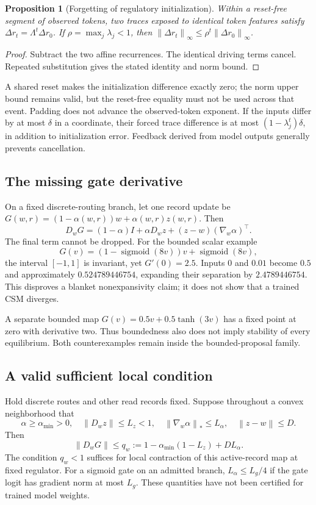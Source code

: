 \documentclass[11pt,a4paper]{article}
\newtheorem{proposition}{Proposition}
\newcommand{\norm}[1]{\left\lVert#1\right\rVert}
\newcommand{\sigmoid}{\operatorname{sigmoid}}
\begin{document}
\begin{proposition}[Forgetting of regulatory initialization]
Within a reset-free segment of observed tokens, two traces exposed to identical
token features satisfy
\(\Delta r_t=\Lambda^t\Delta r_0\). If \(\rho=\max_j\lambda_j<1\), then
\(\norm{\Delta r_t}_\infty\le\rho^t\norm{\Delta r_0}_\infty\).
\end{proposition}
\begin{proof}
Subtract the two affine recurrences. The identical driving terms cancel.
Repeated substitution gives the stated identity and norm bound.
\end{proof}
A shared reset makes the initialization difference exactly zero; the norm
upper bound remains valid, but the reset-free equality must not be used across
that event. Padding does not advance the observed-token exponent.
If the inputs differ by at most \(\delta\) in a coordinate, their forced trace
difference is at most \((1-\lambda_j^t)\delta\), in addition to initialization
error. Feedback derived from model outputs generally prevents cancellation.

\subsection{The missing gate derivative}
On a fixed discrete-routing branch, let one record update be
\(G(w,r)=(1-\alpha(w,r))w+\alpha(w,r)z(w,r)\). Then
\begin{equation}
D_wG=(1-\alpha)I+\alpha D_wz+(z-w)(\nabla_w\alpha)^\top.
\end{equation}
The final term cannot be dropped. For the bounded scalar example
\[
G(v)=(1-\sigmoid(8v))v+\sigmoid(8v),
\]
the interval \([-1,1]\) is invariant, yet \(G'(0)=2.5\). Inputs \(0\) and
\(0.01\) become \(0.5\) and approximately \(0.524789446754\), expanding
their separation by \(2.4789446754\). This disproves a blanket nonexpansivity
claim; it does not show that a trained CSM diverges.

A separate bounded map \(G(v)=0.5v+0.5\tanh(3v)\) has a fixed point at zero
with derivative two. Thus boundedness also does not imply stability of every
equilibrium. Both counterexamples remain inside the bounded-proposal family.

\subsection{A valid sufficient local condition}
Hold discrete routes and other read records fixed. Suppose throughout a convex
neighborhood that
\[
\alpha\ge\alpha_{\min}>0,\quad
\norm{D_wz}\le L_z<1,\quad
\norm{\nabla_w\alpha}_*\le L_\alpha,\quad
\norm{z-w}\le D.
\]
Then
\begin{equation}
\norm{D_wG}\le q_w:=1-\alpha_{\min}(1-L_z)+DL_\alpha.
\end{equation}
The condition \(q_w<1\) suffices for local contraction of this active-record
map at fixed regulator. For a sigmoid gate on an admitted branch,
\(L_\alpha\le L_g/4\) if the gate logit has gradient norm at most \(L_g\).
These quantities have not been certified for trained model weights.
\end{document}
